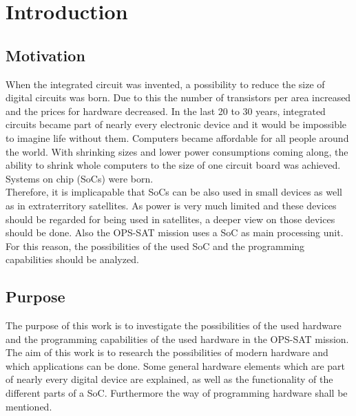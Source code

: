 \chapter{Introduction}
\label{kap:Einleitung} 

\section{Motivation}
When the integrated circuit was invented, a possibility to reduce the size of digital circuits was born. Due to this the number of transistors per area increased and the prices for hardware decreased. In the last 20 to 30 years, integrated circuits became part of nearly every electronic device and it would be impossible to imagine life without them. Computers became affordable for all people around the world. With shrinking sizes and lower power consumptions coming along, the ability to shrink whole computers to the size of one circuit board was achieved. Systems on chip (SoCs) were born.\\
Therefore, it is implicapable that SoCs can be also used in small devices as well as in extraterritory satellites. As power is very much limited and these devices should be regarded for being used in satellites, a deeper view on those devices should be done. Also the OPS-SAT mission uses a SoC as main processing unit. For this reason, the possibilities of the used SoC and the programming capabilities should be analyzed.


\section{Purpose}
The purpose of this work is to investigate the possibilities of the used hardware and the programming capabilities of the used hardware in the OPS-SAT mission. The aim of this work is to research the possibilities of modern hardware and which applications can be done. Some general hardware elements which are part of nearly every digital device are explained, as well as the functionality of the different parts of a SoC. Furthermore the way of programming hardware shall be mentioned.


